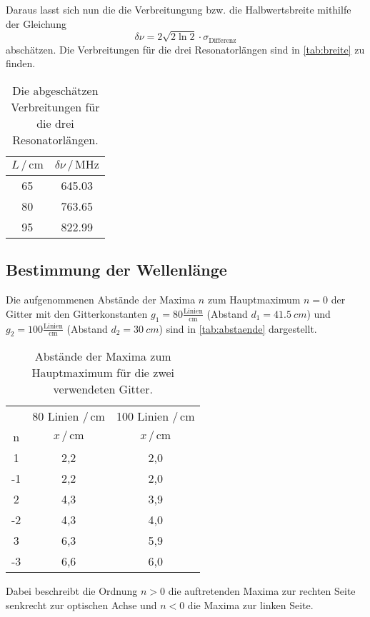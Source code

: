 Daraus lasst sich nun die die Verbreitungung bzw. die Halbwertsbreite mithilfe der Gleichung
\begin{equation*}
    \delta \nu = 2 \sqrt{2 \ln 2} \cdot \sigma_\text{Differenz}
\end{equation*}
abschätzen. 
Die Verbreitungen für die drei Resonatorlängen sind in \autoref{tab:breite} zu finden.
\begin{table}
    \centering
    \caption{Die abgeschätzen Verbreitungen für die drei Resonatorlängen.}
    \label{tab:breite}
    \begin{tabular}{c c}
        \toprule
        $L \, / \, \mathrm{cm}$ & 
        $\delta \nu \, / \, \unit{\mega\hertz}$ \\
        \midrule
           65 & 645.03 \\
           80 & 763.65 \\ 
           95 & 822.99 \\
        \bottomrule
    \end{tabular}
\end{table}

\subsection{Bestimmung der Wellenlänge} \label{sec:lambda}
Die aufgenommenen Abstände der Maxima $n$ zum Hauptmaximum $n = 0$ der Gitter mit den Gitterkonstanten $g_1 = 80 \frac{\text{Linien}}{\unit{\centi\meter}}$ (Abstand $d_1 = \qty{41,5}{cm}$) und
$g_2 = 100 \frac{\text{Linien}}{\unit{\centi\meter}}$ (Abstand $d_2 = \qty{30}{cm}$) sind in \autoref{tab:abstaende} dargestellt.
\begin{table}
    \centering
    \caption{Abstände der Maxima zum Hauptmaximum für die zwei verwendeten Gitter.}
    \label{tab:abstaende}
    \begin{tabular}{c c c}
        \toprule
           &  80 Linien $/ \, \mathrm{cm}$ &  100 Linien $/ \, \mathrm{cm}$ \\
         n &  $x \, / \, \mathrm{cm}$ &  $x \, / \, \mathrm{cm}$ \\
        \midrule
         1 &     2,2 &       2,0 \\
        -1 &     2,2 &       2,0 \\
         2 &     4,3 &       3,9 \\
        -2 &     4,3 &       4,0 \\
         3 &     6,3 &       5,9 \\
        -3 &     6,6 &       6,0 \\
        \bottomrule
    \end{tabular}
\end{table}
Dabei beschreibt die Ordnung $n>0$ die auftretenden Maxima zur rechten Seite
senkrecht zur optischen Achse und $n<0$ die Maxima zur linken Seite.

